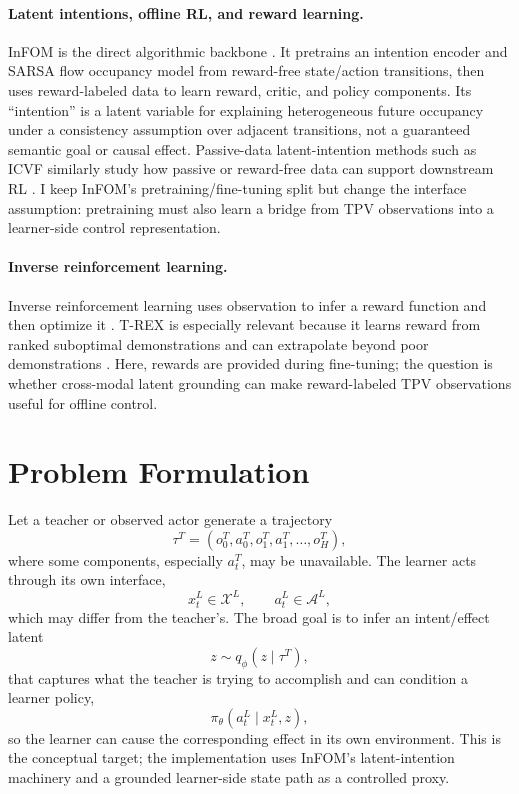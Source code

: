 \documentclass{article}
\begin{document}
\paragraph{Latent intentions, offline RL, and reward learning.}
InFOM is the direct algorithmic backbone \citep{Zheng2025InFOM}. It pretrains an intention encoder and SARSA flow occupancy model from reward-free state/action transitions, then uses reward-labeled data to learn reward, critic, and policy components. Its ``intention'' is a latent variable for explaining heterogeneous future occupancy under a consistency assumption over adjacent transitions, not a guaranteed semantic goal or causal effect. Passive-data latent-intention methods such as ICVF similarly study how passive or reward-free data can support downstream RL \citep{Ghosh2023ICVF}. I keep InFOM's pretraining/fine-tuning split but change the interface assumption: pretraining must also learn a bridge from TPV observations into a learner-side control representation.

\paragraph{Inverse reinforcement learning.}
Inverse reinforcement learning uses observation to infer a reward function and then optimize it \citep{NgRussell2000IRL}. T-REX is especially relevant because it learns reward from ranked suboptimal demonstrations and can extrapolate beyond poor demonstrations \citep{Brown2019TREX}. Here, rewards are provided during fine-tuning; the question is whether cross-modal latent grounding can make reward-labeled TPV observations useful for offline control.

\section{Problem Formulation}

Let a teacher or observed actor generate a trajectory
\begin{equation}
    \tau^T = (o^T_0, a^T_0, o^T_1, a^T_1, \ldots, o^T_H),
\end{equation}
where some components, especially $a^T_t$, may be unavailable. The learner acts through its own interface,
\begin{equation}
    x^L_t \in \mathcal{X}^L, \qquad a^L_t \in \mathcal{A}^L,
\end{equation}
which may differ from the teacher's. The broad goal is to infer an intent/effect latent
\begin{equation}
    z \sim q_\phi(z \mid \tau^T),
\end{equation}
that captures what the teacher is trying to accomplish and can condition a learner policy,
\begin{equation}
    \pi_\theta(a^L_t \mid x^L_t, z),
\end{equation}
so the learner can cause the corresponding effect in its own environment. This is the conceptual target; the implementation uses InFOM's latent-intention machinery and a grounded learner-side state path as a controlled proxy.
\end{document}
